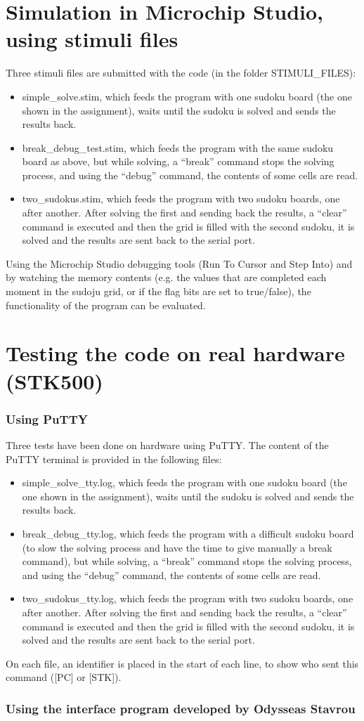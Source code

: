 \documentclass[12pt, a4]{article}
\begin{document}
\section*{Simulation in Microchip Studio, using stimuli files}
Three stimuli files are submitted with the code (in the folder STIMULI\_FILES):
\begin{itemize}
\item simple\_solve.stim, which feeds the program with one sudoku board (the one shown in the assignment), waits until the sudoku is solved and sends the results back.
\item break\_debug\_test.stim, which feeds the program with the same sudoku board as above, but while solving, a “break” command stops the solving process, and using the “debug” command, the contents of some cells are read.
\item two\_sudokus.stim, which feeds the program with two sudoku boards, one after another. After solving the first and sending back the results, a “clear” command is executed and then the grid is filled with the second sudoku, it is solved and the results are sent back to the serial port.
\end{itemize}
Using the Microchip Studio debugging tools (Run To Cursor and Step Into) and by watching the memory contents (e.g. the values that are completed each moment in the sudoju grid, or if the flag bits are set to true/false), the functionality of the program can be evaluated.

\section*{Testing the code on real hardware (STK500)}
\subsubsection*{Using PuTTY}
Three tests have been done on hardware using PuTTY. The content of the PuTTY terminal is provided in the following files:
\begin{itemize}
\item simple\_solve\_tty.log, which feeds the program with one sudoku board (the one shown in the assignment), waits until the sudoku is solved and sends the results back.
\item break\_debug\_tty.log, which feeds the program with a difficult sudoku board (to slow the solving process and have the time to give manually a break command), but while solving, a “break” command stops the solving process, and using the “debug” command, the contents of some cells are read.
\item two\_sudokus\_tty.log, which feeds the program with two sudoku boards, one after another. After solving the first and sending back the results, a “clear” command is executed and then the grid is filled with the second sudoku, it is solved and the results are sent back to the serial port.
\end{itemize}
On each file, an identifier is placed in the start of each line, to show who sent this command ([PC] or [STK]).

\subsubsection*{Using the interface program developed by Odysseas Stavrou}
\end{document}
